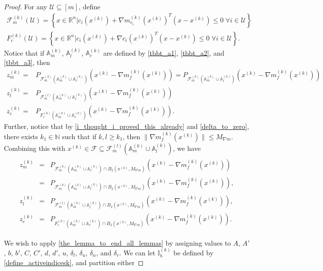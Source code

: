 \documentclass{article}
\theoremstyle{case}
\numberwithin{theorem}{subsection}
\newcommand{\feasiblek}{{\mathcal F_m^{(k)}}}
\newcommand{\feasiblel}{{\mathcal F_m^{(l)}}}
\newcommand{\feasible}{{\mathcal F}}
\newcommand{\gk}{{\nabla m_f^{(k)}\left(\xk\right)}}
\newcommand{\gmcik}{{\nabla m_{c_i}^{(k)}\left(\xk\right)}}
\newcommand{\naturals}{\mathbb N}
\newcommand{\Rn}{\mathbb R^n}
\newcommand{\xk}{x^{(k)}}
\newcommand{\truefeasiblek}{{F_c^{(k)}}}
\newcommand{\maxmodelgrad}{{M_{\nabla m}}}
\newcommand{\activeindicesk}{{ \mathbb I_h^{(k)} }}
\newcommand{\zmk}{{z_m^{(k)}}}
\newcommand{\zlk}{{z_l^{(k)}}}
\newcommand{\zck}{{z_c^{(k)}}}
\newcommand{\Amk}{{\mathbb A_m^{(k)}}}
\newcommand{\Alk}{{\mathbb A_l^{(k)}}}
\newcommand{\Ack}{{\mathbb A_c^{(k)}}}
\begin{document}
\begin{proof}

For any $\mathcal U \subseteq [m]$, define
\begin{align*}
\feasiblek(\mathcal U)  = \left\{x \in \Rn \bigg| c_i\left(\xk\right) + \gmcik^T\left(x - \xk\right) \le 0 \; \forall i \in \mathcal U \right\} \\
\truefeasiblek(\mathcal U)  = \left\{x \in \Rn \bigg| c_i\left(\xk\right) + \nabla c_i\left(\xk\right)^T\left(x - \xk\right) \le 0 \; \forall i \in \mathcal U \right\}.
\end{align*}
Notice that if $\Amk$, $\Alk$, $\Ack$
are defined by
\cref{tbbt_a1}, \cref{tbbt_a2}, and \cref{tbbt_a3},
then
\begin{align*}
\zmk =& P_{\feasiblek\left(\Amk \cup \Ack\right)}\left(\xk - \gk\right) = P_{\feasiblek\left(\Amk \cup \Alk\right)}\left(\xk - \gk\right)\\
\zlk =& P_{\feasiblel\left(\Amk \cup \Alk\right)}\left(\xk - \gk\right) \\
\zck =& P_{\truefeasiblek\left(\Amk \cup \Ack\right)}\left(\xk - \gk\right).
\end{align*}
Further, notice that by \cref{i_thought_i_proved_this_already} and \cref{delta_to_zero}, there exists $k_1 \in \naturals$ such that if $k, l \ge k_1$, 
then
$\|\gk\| \le \maxmodelgrad$.
Combining this with $\xk \in \feasible \subseteq \feasiblel\left(\Amk \cup \Alk\right)$, we have 
\begin{align}
\begin{array}{ccc}
\zmk &=& P_{\feasiblek\left(\Amk \cup \Ack\right) \cap B_2\left(\xk, \maxmodelgrad\right)}\left(\xk - \gk\right)  \\
     &=& P_{\feasiblek\left(\Amk \cup \Alk\right) \cap B_2\left(\xk, \maxmodelgrad\right)}\left(\xk - \gk\right), \\
\zlk &=& P_{\feasiblel\left(\Amk \cup \Alk\right) \cap B_2\left(\xk, \maxmodelgrad\right)}\left(\xk - \gk\right), \\
\zck &=& P_{\truefeasiblek\left(\Amk \cup \Ack\right) \cap B_2\left(\xk, \maxmodelgrad\right)}\left(\xk - \gk\right).
\end{array}\label{cbpt_eqn1}
\end{align}

We wish to apply \cref{the_lemma_to_end_all_lemmas} by assigning values to
$A$, $A'$, $b$, $b'$, $C$, $C'$, $d$, $d'$, $u$, $\delta_l$, $\delta_u$, $\delta_{\alpha}$, and $\delta_r$.
We can let $\activeindicesk$ be defined by \cref{define_activeindicesk}, and partition either


\end{proof}
\end{document}
